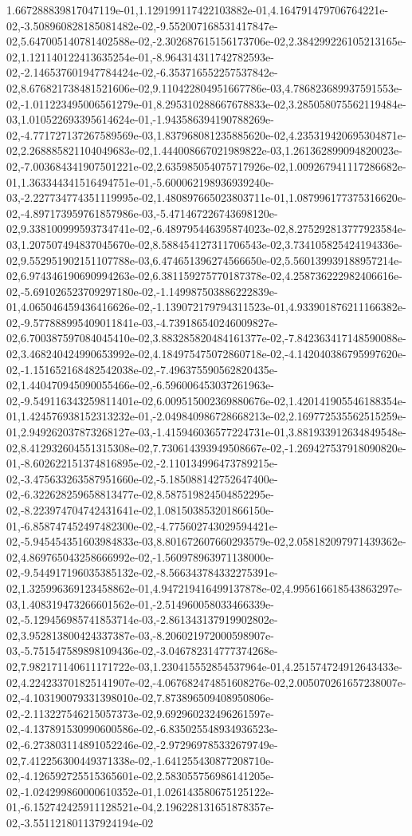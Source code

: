 1.667288839817047119e-01,1.129199117422103882e-01,4.164791479706764221e-02,-3.508960828185081482e-02,-9.552007168531417847e-02,5.647005140781402588e-02,-2.302687615156173706e-02,2.384299226105213165e-02,1.121140122413635254e-01,-8.964314311742782593e-02,-2.146537601947784424e-02,-6.353716552257537842e-02,8.676821738481521606e-02,9.110422804951667786e-03,4.786823689937591553e-02,-1.011223495006561279e-01,8.295310288667678833e-02,3.285058075562119484e-03,1.010522693395614624e-01,-1.943586394190788269e-02,-4.771727137267589569e-03,1.837968081235885620e-02,4.235319420695304871e-02,2.268885821104049683e-02,1.444008667021989822e-03,1.261362899094820023e-02,-7.003684341907501221e-02,2.635985054075717926e-02,1.009267941117286682e-01,1.363344341516494751e-01,-5.600062198936939240e-03,-2.227734774351119995e-02,1.480897665023803711e-01,1.087996177375316620e-02,-4.897173959761857986e-03,-5.471467226743698120e-02,9.338100999593734741e-02,-6.489795446395874023e-02,8.275292813777923584e-03,1.207507494837045670e-02,8.588454127311706543e-02,3.734105825424194336e-02,9.552951902151107788e-03,6.474651396274566650e-02,5.560139939188957214e-02,6.974346190690994263e-02,6.381159275770187378e-02,4.258736222982406616e-02,-5.691026523709297180e-02,-1.149987503886222839e-01,4.065046459436416626e-02,-1.139072179794311523e-01,4.933901876211166382e-02,-9.577888995409011841e-03,-4.739186540246009827e-02,6.700387597084045410e-02,3.883285820484161377e-02,-7.842363417148590088e-02,3.468240424990653992e-02,4.184975475072860718e-02,-4.142040386795997620e-02,-1.151652168482542038e-02,-7.496375590562820435e-02,1.440470945090055466e-02,-6.596006453037261963e-02,-9.549116343259811401e-02,6.009515002369880676e-02,1.420141905546188354e-01,1.424576938152313232e-01,-2.049840986728668213e-02,2.169772535562515259e-01,2.949262037873268127e-03,-1.415946036577224731e-01,3.881933912634849548e-02,8.412932604551315308e-02,7.730614393949508667e-02,-1.269427537918090820e-01,-8.602622151374816895e-02,-2.110134996473789215e-02,-3.475633263587951660e-02,-5.185088142752647400e-02,-6.322628259658813477e-02,8.587519824504852295e-02,-8.223974704742431641e-02,1.081503853201866150e-01,-6.858747452497482300e-02,-4.775602743029594421e-02,-5.945454351603984833e-03,8.801672607660293579e-02,2.058182097971439362e-02,4.869765043258666992e-02,-1.560978963971138000e-02,-9.544917196035385132e-02,-8.566343784332275391e-02,1.325996369123458862e-01,4.947219416499137878e-02,4.995616618543863297e-03,1.408319473266601562e-01,-2.514960058033466339e-02,-5.129456985741853714e-03,-2.861343137919902802e-02,3.952813800424337387e-03,-8.206021972000598907e-03,-5.751547589898109436e-02,-3.046782314777374268e-02,7.982171140611171722e-03,1.230415552854537964e-01,4.251574724912643433e-02,4.224233701825141907e-02,-4.067682474851608276e-02,2.005070261657238007e-02,-4.103190079331398010e-02,7.873896509408950806e-02,-2.113227546215057373e-02,9.692960232496261597e-02,-4.137891530990600586e-02,-6.835025548934936523e-02,-6.273803114891052246e-02,-2.972969785332679749e-02,7.412256300449371338e-02,-1.641255430877208710e-02,-4.126592725515365601e-02,2.583055756986141205e-02,-1.024299860000610352e-01,1.026143580675125122e-01,-6.152742425911128521e-04,2.196228131651878357e-02,-3.551121801137924194e-02
